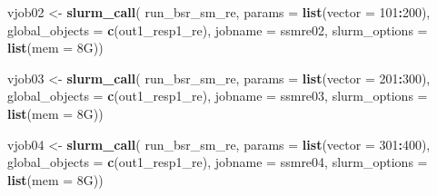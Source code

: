 \documentclass[12pt, twoside]{amherstthesis}
\newenvironment{Shaded}{\begin{snugshade}}{\end{snugshade}}
\newcommand{\AttributeTok}[1]{\textcolor[rgb]{0.13,0.29,0.53}{#1}}
\newcommand{\DecValTok}[1]{\textcolor[rgb]{0.00,0.00,0.81}{#1}}
\newcommand{\FunctionTok}[1]{\textcolor[rgb]{0.13,0.29,0.53}{\textbf{#1}}}
\newcommand{\NormalTok}[1]{#1}
\newcommand{\OtherTok}[1]{\textcolor[rgb]{0.56,0.35,0.01}{#1}}
\newcommand{\SpecialCharTok}[1]{\textcolor[rgb]{0.81,0.36,0.00}{\textbf{#1}}}
\newcommand{\StringTok}[1]{\textcolor[rgb]{0.31,0.60,0.02}{#1}}
\begin{document}
\begin{Shaded}
\begin{Highlighting}[]
\NormalTok{vjob02 }\OtherTok{\textless{}{-}} \FunctionTok{slurm\_call}\NormalTok{(}
\NormalTok{  run\_bsr\_sm\_re, }\AttributeTok{params =} \FunctionTok{list}\NormalTok{(}\AttributeTok{vector =} \DecValTok{101}\SpecialCharTok{:}\DecValTok{200}\NormalTok{),}
  \AttributeTok{global\_objects =} \FunctionTok{c}\NormalTok{(}\StringTok{\textquotesingle{}out1\_resp1\_re\textquotesingle{}}\NormalTok{),}
  \AttributeTok{jobname =} \StringTok{\textquotesingle{}ssmre02\textquotesingle{}}\NormalTok{,}
  \AttributeTok{slurm\_options =} \FunctionTok{list}\NormalTok{(}\AttributeTok{mem =} \StringTok{\textquotesingle{}8G\textquotesingle{}}\NormalTok{))}

\NormalTok{vjob03 }\OtherTok{\textless{}{-}} \FunctionTok{slurm\_call}\NormalTok{(}
\NormalTok{  run\_bsr\_sm\_re, }\AttributeTok{params =} \FunctionTok{list}\NormalTok{(}\AttributeTok{vector =} \DecValTok{201}\SpecialCharTok{:}\DecValTok{300}\NormalTok{),}
  \AttributeTok{global\_objects =} \FunctionTok{c}\NormalTok{(}\StringTok{\textquotesingle{}out1\_resp1\_re\textquotesingle{}}\NormalTok{),}
  \AttributeTok{jobname =} \StringTok{\textquotesingle{}ssmre03\textquotesingle{}}\NormalTok{,}
  \AttributeTok{slurm\_options =} \FunctionTok{list}\NormalTok{(}\AttributeTok{mem =} \StringTok{\textquotesingle{}8G\textquotesingle{}}\NormalTok{))}

\NormalTok{vjob04 }\OtherTok{\textless{}{-}} \FunctionTok{slurm\_call}\NormalTok{(}
\NormalTok{  run\_bsr\_sm\_re, }\AttributeTok{params =} \FunctionTok{list}\NormalTok{(}\AttributeTok{vector =} \DecValTok{301}\SpecialCharTok{:}\DecValTok{400}\NormalTok{),}
  \AttributeTok{global\_objects =} \FunctionTok{c}\NormalTok{(}\StringTok{\textquotesingle{}out1\_resp1\_re\textquotesingle{}}\NormalTok{),}
  \AttributeTok{jobname =} \StringTok{\textquotesingle{}ssmre04\textquotesingle{}}\NormalTok{,}
  \AttributeTok{slurm\_options =} \FunctionTok{list}\NormalTok{(}\AttributeTok{mem =} \StringTok{\textquotesingle{}8G\textquotesingle{}}\NormalTok{))}
\end{Highlighting}
\end{Shaded}
\normalsize
\end{document}
